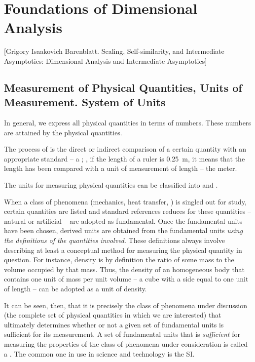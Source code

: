 \section{Foundations of Dimensional Analysis}
[Grigory Isaakovich Barenblatt. Scaling, Self-similarity, and Intermediate Asymptotics: Dimensional Analysis and Intermediate Asymptotics]

\subsection{Measurement of Physical Quantities, Units of Measurement. System of Units}
In general, we express all physical quantities in terms of numbers. These numbers are attained by  the physical quantities.

The process of  is the direct or indirect comparison of a certain quantity with an appropriate standard -- a ; \eg, if the length of a ruler is \SI{0.25}{m}, it means that the length has been compared with a unit of measurement of length -- the meter.

The units for measuring physical quantities can be classified into  and .

When a class of phenomena (mechanics, heat transfer, \etc) is singled out for study, certain quantities are listed and standard references reduces for these quantities -- natural or artificial -- are adopted as fundamental. Once the fundamental units have been chosen, derived units are obtained from the fundamental units \emph{using the definitions of the quantities involved}. These definitions always involve describing at least a conceptual method for measuring the physical quantity in question. For instance, density is by definition the ratio of some mass to the volume occupied by that mass. Thus, the density of an homogeneous body that contains one unit of mass per unit volume -- a cube with a side equal to one unit of length -- can be adopted as a unit of density.

It can be seen, then, that it is precisely the class of phenomena under discussion (the complete set of physical quantities in which we are interested) that ultimately determines whether or not a given set of fundamental units is sufficient for its measurement. A set of fundamental units that is \emph{sufficient} for measuring the properties of the class of phenomena under consideration is called a . The common one in use in science and technology is the SI.

